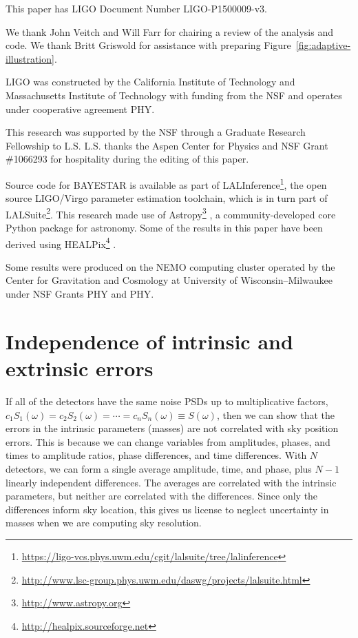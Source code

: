 \documentclass[amsmath,amssymb,aps,prx,reprint,nopreprintnumbers,nofootinbib,showpacs]{revtex4-1}
\begin{document}


\begin{acknowledgements}
This paper has LIGO Document Number LIGO\nobreakdashes-P1500009\nobreakdashes-v3.

We thank John Veitch and Will Farr for chairing a review of the analysis and code. We thank Britt Griswold for assistance with preparing Figure~\ref{fig:adaptive-illustration}.
\end{acknowledgements}

LIGO was constructed by the California Institute of Technology and Massachusetts Institute of Technology with funding from the \ac{NSF} and operates under cooperative agreement PHY.

This research was supported by the \ac{NSF} through a Graduate Research Fellowship to L.S. L.S. thanks the Aspen Center for Physics and \ac{NSF} Grant \#1066293 for hospitality during the editing of this paper.

Source code for \ac{BAYESTAR} is available as part of LALInference\footnote{\url{https://ligo-vcs.phys.uwm.edu/cgit/lalsuite/tree/lalinference}}, the open source LIGO/Virgo parameter estimation toolchain, which is in turn part of LALSuite\footnote{\url{http://www.lsc-group.phys.uwm.edu/daswg/projects/lalsuite.html}}. This research made use of Astropy\footnote{\url{http://www.astropy.org}} \citep{astropy}, a community-developed core Python package for astronomy. Some of the results in this paper have been derived using \ac{HEALPix}\footnote{\url{http://healpix.sourceforge.net}} \cite{healpix}.

Some results were produced on the NEMO computing cluster operated by the Center for Gravitation and Cosmology at University of Wisconsin\nobreakdashes--Milwaukee under \ac{NSF} Grants PHY and PHY.

\appendix

\section{Independence of intrinsic and extrinsic errors}
\label{sec:independence-intrinsic-extrinsic}

If all of the detectors have the same noise \acp{PSD} up to multiplicative factors, $c_1 S_1(\omega) = c_2 S_2(\omega) = \cdots = c_n S_n(\omega) \equiv S(\omega)$, then we can show that the errors in the intrinsic parameters (masses) are not correlated with sky position errors. This is because we can change variables from amplitudes, phases, and times to amplitude ratios, phase differences, and time differences. With $N$ detectors, we can form a single average amplitude, time, and phase, plus $N-1$ linearly independent differences. The averages are correlated with the intrinsic parameters, but neither are correlated with the differences. Since only the differences inform sky location, this gives us license to neglect uncertainty in masses when we are computing sky resolution.
\end{document}

